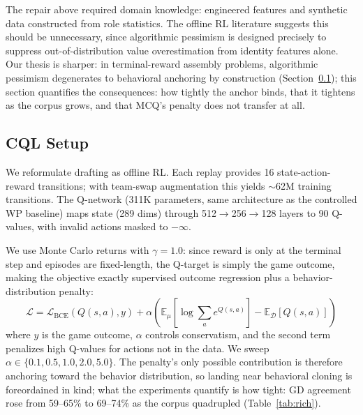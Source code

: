 \documentclass[journal]{IEEEtran}
\begin{document}
The repair above required domain knowledge: engineered features and synthetic data constructed from role statistics. The offline RL literature suggests this should be unnecessary, since algorithmic pessimism is designed precisely to suppress out-of-distribution value overestimation from identity features alone. Our thesis is sharper: in terminal-reward assembly problems, algorithmic pessimism degenerates to behavioral anchoring by construction (Section~\ref{sec:cqlsetup}); this section quantifies the consequences: how tightly the anchor binds, that it tightens as the corpus grows, and that MCQ's penalty does not transfer at all.

\subsection{CQL Setup}
\label{sec:cqlsetup}

We reformulate drafting as offline RL. Each replay provides 16 state-action-reward transitions; with team-swap augmentation this yields $\sim$62M training transitions.
The Q-network (311K parameters, same architecture as the controlled WP baseline) maps state (289 dims) through 512$\to$256$\to$128 layers to 90 Q-values, with invalid actions masked to $-\infty$.

We use Monte Carlo returns with $\gamma = 1.0$: since reward is only at the terminal step and episodes are fixed-length, the Q-target is simply the game outcome, making the objective exactly supervised outcome regression plus a behavior-distribution penalty:
\begin{equation}
\mathcal{L} = \mathcal{L}_\text{BCE}(Q(s,a), y) + \alpha \left( \mathbb{E}_\mu[\log \sum_a e^{Q(s,a)}] - \mathbb{E}_\mathcal{D}[Q(s,a)] \right)
\end{equation}
where $y$ is the game outcome, $\alpha$ controls conservatism, and the second term penalizes high Q-values for actions not in the data. We sweep $\alpha \in \{0.1, 0.5, 1.0, 2.0, 5.0\}$. The penalty's only possible contribution is therefore anchoring toward the behavior distribution, so landing near behavioral cloning is foreordained in kind; what the experiments quantify is how tight: GD agreement rose from 59--65\% to 69--74\% as the corpus quadrupled (Table~\ref{tab:rich}).
\end{document}
